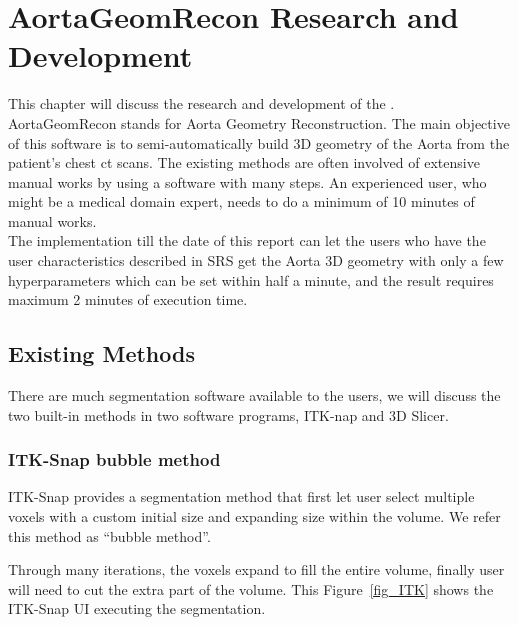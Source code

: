\chapter{AortaGeomRecon Research and Development}

This chapter will discuss the research and development of the \progname{}.\\
AortaGeomRecon stands for Aorta Geometry Reconstruction. The main objective of this software is to semi-automatically build 3D geometry of the Aorta from the patient's chest ct scans.  The existing methods are often involved of extensive manual works by using a software with many steps. An experienced user, who might be a medical domain expert, needs to do a minimum of 10 minutes of manual works. \\
The implementation till the date of this report can let the users who have the user characteristics described in SRS \citep{SRS} get the Aorta 3D geometry with only a few hyperparameters which can be set within half a minute, and the result requires maximum 2 minutes of execution time. \\


\section{Existing Methods}
There are much segmentation software available to the users, we will discuss the two built-in methods in two software programs, ITK-nap and 3D Slicer.

\subsection{ITK-Snap bubble method} 
\indent
ITK-Snap provides a segmentation method that first let user select multiple voxels with a custom initial size and expanding size within the volume. We refer this method as ``bubble method''.

Through many iterations, the voxels expand to fill the entire volume, finally user will need to cut the extra part of the volume. This Figure~\ref{fig_ITK} shows the ITK-Snap UI executing the segmentation.

